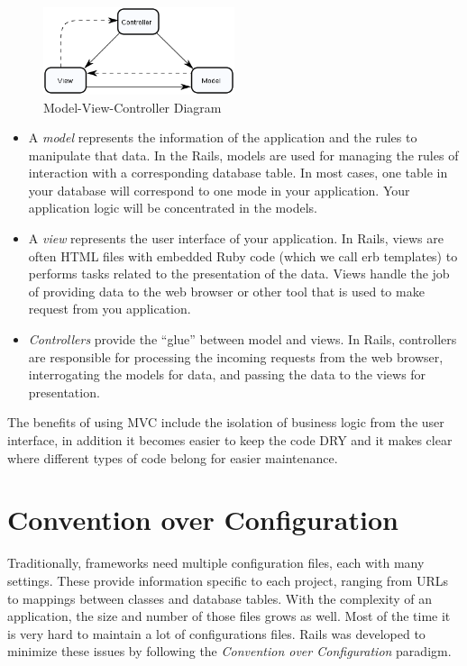 \begin{figure}[h!]
  \caption{Model-View-Controller Diagram}
  \centering
  \includegraphics[width=0.5\textwidth]{Images/ModelViewController}
\end{figure}

\begin{itemize}
\item A \emph{model} represents the information of the application and the rules to manipulate that data. In the Rails, models are used for managing the rules of interaction with a corresponding database table. In most cases, one table in your database will correspond to one mode in your application. Your application logic will be concentrated in the models.
\item A \emph{view} represents the user interface of your application. In Rails, views are often HTML files with embedded Ruby code (which we call erb templates) to performs tasks related to the presentation of the data. Views handle the job of providing data to the web browser or other tool that is used to make request from you application.
\item \emph{Controllers} provide the “glue” between model and views. In Rails, controllers are responsible for processing the incoming requests from the web browser, interrogating the models for data, and passing the data to the views for presentation.
\end{itemize}

The benefits of using MVC include the isolation of business logic from the user interface,
in addition it becomes easier to keep the code DRY and 
it makes clear where different types of code belong for easier maintenance.



\section{Convention over Configuration} 
Traditionally, frameworks need multiple configuration files, each with many settings. 
These provide information specific to each project, ranging from URLs to mappings between classes and database tables. 
With the complexity of an application, the size and number of those files grows as well. 
Most of the time it is very hard to maintain a lot of configurations files. 
Rails was developed to minimize these issues by following the \emph{Convention over Configuration} paradigm.

